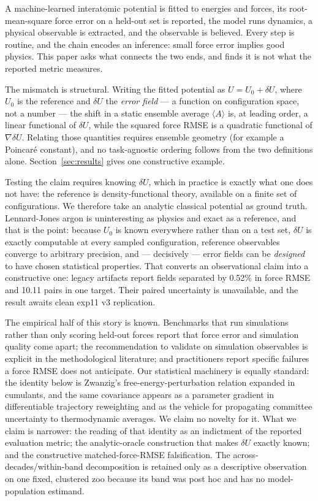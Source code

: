 \documentclass[aip,jcp,reprint,amsmath,amssymb,floatfix]{revtex4-2}
\newcommand{\dU}{\ensuremath{\delta U}}
\newcommand{\avg}[1]{\ensuremath{\langle #1 \rangle}}
\begin{document}
A machine-learned interatomic potential is fitted to energies and forces, its
root-mean-square force error on a held-out set is reported, the model runs
dynamics, a physical observable is extracted, and the
observable is believed. Every step is routine, and the chain
encodes an inference: small force error implies good physics. This paper
asks what connects the two ends, and finds it is not
what the reported metric measures.

The mismatch is structural. Writing the fitted
potential as $U = U_0 + \dU$, where $U_0$ is the reference and $\dU$ the
\emph{error field} --- a function on configuration space, not a number --- the
shift in a static ensemble average $\avg{A}$ is, at leading order, a linear
functional of $\dU$, while the squared force RMSE is a quadratic functional of
$\nabla\dU$. Relating those quantities requires ensemble geometry (for example
a Poincar\'e constant), and no task-agnostic ordering follows from the two
definitions alone. Section~\ref{sec:results} gives one constructive example.

Testing the claim requires knowing $\dU$, which in practice is exactly
what one does not have: the reference is density-functional theory, available on
a finite set of configurations. We therefore take an analytic classical
potential as ground truth. Lennard-Jones argon\cite{Jones1924, Rahman1964,
Verlet1967} is uninteresting as physics and exact as a reference, and that is
the point: because $U_0$ is known everywhere rather than
on a test set, $\dU$ is exactly computable at every sampled configuration,
reference observables converge to arbitrary precision, and --- decisively ---
error fields can be \emph{designed} to have chosen statistical properties. That
converts an observational claim into a constructive one: legacy artifacts report
fields separated by 0.52\% in force RMSE and 10.11 pairs in one target. Their
paired uncertainty is unavailable, and the result awaits clean exp11 v3 replication.

The empirical half of this story is known. Benchmarks that run
simulations rather than only scoring held-out
forces report that force error and simulation quality come
apart\cite{Fu2023, Stocker2022}; the recommendation to validate on
simulation observables is explicit in the methodological
literature\cite{Morrow2023}; and practitioners report specific failures
a force RMSE does not anticipate\cite{Kovacs2021, Deng2025, Pota2024}. Our
statistical machinery is equally standard: the identity below is
Zwanzig's free-energy-perturbation relation\cite{Zwanzig1954} expanded in
cumulants, and the same covariance appears as a parameter gradient in
differentiable trajectory reweighting\cite{Thaler2021} and as the vehicle for
propagating committee uncertainty to thermodynamic
averages\cite{Imbalzano2021}. We claim no novelty for it. What we claim is
narrower: the reading of
that identity as an indictment of the reported evaluation metric; the
analytic-oracle construction that makes $\dU$ exactly known; and the
constructive matched-force-RMSE falsification. The across-decades/within-band
decomposition is retained only as a descriptive observation on one fixed,
clustered zoo because its band was post hoc and has no model-population estimand.
\end{document}
